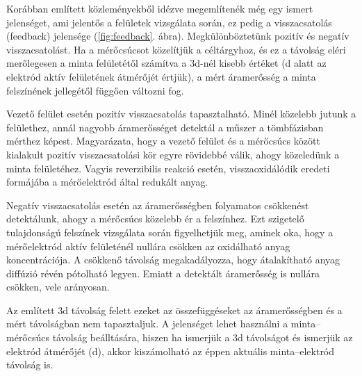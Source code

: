 Korábban említett közleményekből idézve megemlítenék még egy ismert jelenséget, ami jelentős a felületek vizsgálata során, ez pedig a visszacsatolás (feedback) jelensége (\ref{fig:feedback}. ábra). Megkülönböztetünk pozitív és negatív visszacsatolást. Ha a mérőcsúcsot közelítjük a céltárgyhoz, és ez a távolság eléri merőlegesen a minta felületétől számítva a 3d-nél kisebb értéket (d alatt az elektród aktív felületének átmérőjét értjük), a mért áramerősség a minta felszínének jellegétől függően változni fog. 

Vezető felület esetén pozitív visszacsatolás tapasztalható. Minél közelebb jutunk a felülethez, annál nagyobb áramerősséget detektál a műszer a tömbfázisban mérthez képest.  Magyarázata, hogy a vezető felület és a mérőcsúcs között kialakult pozitív visszacsatolási kör egyre rövidebbé válik, ahogy közeledünk a minta felületéhez. Vagyis reverzibilis reakció esetén, visszaoxidálódik eredeti formájába a mérőelektród által redukált anyag. 

Negatív visszacsatolás esetén az áramerősségben folyamatos csökkenést detektálunk, ahogy a mérőcsúcs közelebb ér a felszínhez. Ezt szigetelő tulajdonságú felszínek vizsgálata során figyelhetjük meg, aminek oka, hogy a mérőelektród aktív felületénél nullára csökken az oxidálható anyag koncentrációja. A csökkenő távolság megakadályozza, hogy átalakítható anyag diffúzió révén pótolható legyen. Emiatt a detektált áramerősség is nullára csökken, vele arányosan.

Az említett 3d távolság felett ezeket az összefüggéseket az áramerősségben és a mért távolságban nem tapasztaljuk. A jelenséget lehet használni a minta--mérőcsúcs távolság beálltására, hiszen ha ismerjük a 3d távolságot és ismerjük az elektród átmérőjét (d), akkor kiszámolható az éppen aktuális minta--elektród távolság is.

